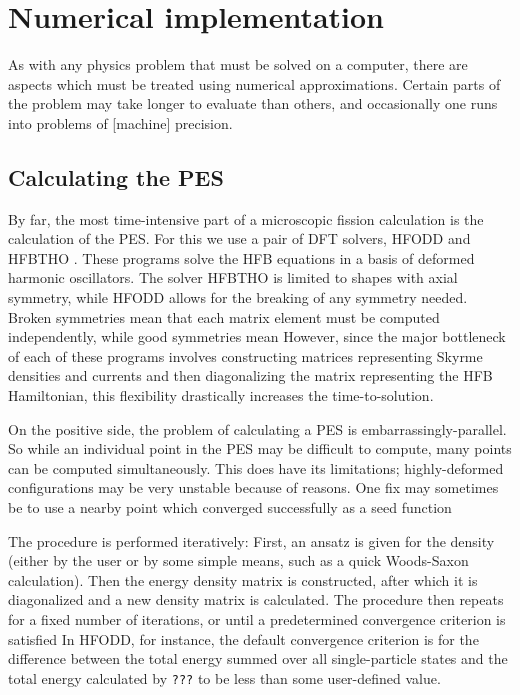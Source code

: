 \chapter{Numerical implementation}\label{chap:Numerical}

As with any physics problem that must be solved on a computer, there are aspects which must be treated using numerical approximations. Certain parts of the problem may take longer to evaluate than others, and occasionally one runs into problems of [machine] precision.

\section{Calculating the PES}
By far, the most time-intensive part of a microscopic fission calculation is the calculation of the PES. For this we use a pair of DFT solvers, HFODD \cite{Schunck2017} and HFBTHO \cite{Perez2017}. These programs solve the HFB equations in a basis of deformed harmonic oscillators. The solver HFBTHO is limited to shapes with axial symmetry, while HFODD allows for the breaking of any symmetry needed. Broken symmetries mean that each matrix element must be computed independently, while good symmetries mean However, since the major bottleneck of each of these programs involves constructing matrices representing Skyrme densities and currents and then diagonalizing the matrix representing the HFB Hamiltonian, this flexibility drastically increases the time-to-solution.

On the positive side, the problem of calculating a PES is embarrassingly-parallel. So while an individual point in the PES may be difficult to compute, many points can be computed simultaneously. This does have its limitations; highly-deformed configurations may be very unstable because of reasons. One fix may sometimes be to use a nearby point which converged successfully as a seed function

The procedure is performed iteratively: First, an ansatz is given for the density (either by the user or by some simple means, such as a quick Woods-Saxon calculation). Then the energy density matrix is constructed, after which it is diagonalized and a new density matrix is calculated. The procedure then repeats for a fixed number of iterations, or until a predetermined convergence criterion is satisfied In HFODD, for instance, the default convergence criterion is for the difference between the total energy summed over all single-particle states and the total energy calculated by \verb|???| to be less than some user-defined value.

